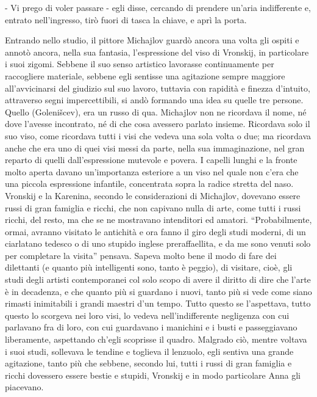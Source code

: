 - Vi prego di voler passare - egli disse, cercando di prendere un'aria indifferente e, entrato nell'ingresso, tirò fuori di tasca la chiave, e aprì la porta. 

Entrando nello studio, il pittore Michajlov guardò ancora una volta gli ospiti e annotò ancora, nella sua fantasia, l'espressione del viso di Vronskij, in particolare i suoi zigomi. Sebbene il suo senso artistico lavorasse continuamente per raccogliere materiale, sebbene egli sentisse una agitazione sempre maggiore all'avvicinarsi del giudizio sul suo lavoro, tuttavia con rapidità e finezza d'intuito, attraverso segni impercettibili, si andò formando una idea su quelle tre persone. Quello (Golenišcev), era un russo di qua. Michajlov non ne ricordava il nome, né dove l'avesse incontrato, né di che cosa avessero parlato insieme. Ricordava solo il suo viso, come ricordava tutti i visi che vedeva una sola volta o due; ma ricordava anche che era uno di quei visi messi da parte, nella sua immaginazione, nel gran reparto di quelli dall'espressione mutevole e povera. I capelli lunghi e la fronte molto aperta davano un'importanza esteriore a un viso nel quale non c'era che una piccola espressione infantile, concentrata sopra la radice stretta del naso. Vronskij e la Karenina, secondo le considerazioni di Michajlov, dovevano essere russi di gran famiglia e ricchi, che non capivano nulla di arte, come tutti i russi ricchi, del resto, ma che se ne mostravano intenditori ed amatori. ``Probabilmente, ormai, avranno visitato le antichità e ora fanno il giro degli studi moderni, di un ciarlatano tedesco o di uno stupido inglese preraffaellita, e da me sono venuti solo per completare la visita'' pensava. Sapeva molto bene il modo di fare dei dilettanti (e quanto più intelligenti sono, tanto è peggio), di visitare, cioè, gli studi degli artisti contemporanei col solo scopo di avere il diritto di dire che l'arte è in decadenza, e che quanto più si guardano i nuovi, tanto più si vede come siano rimasti inimitabili i grandi maestri d'un tempo. Tutto questo se l'aspettava, tutto questo lo scorgeva nei loro visi, lo vedeva nell'indifferente negligenza con cui parlavano fra di loro, con cui guardavano i manichini e i busti e passeggiavano liberamente, aspettando ch'egli scoprisse il quadro. Malgrado ciò, mentre voltava i suoi studi, sollevava le tendine e toglieva il lenzuolo, egli sentiva una grande agitazione, tanto più che sebbene, secondo lui, tutti i russi di gran famiglia e ricchi dovessero essere bestie e stupidi, Vronskij e in modo particolare Anna gli piacevano. 

